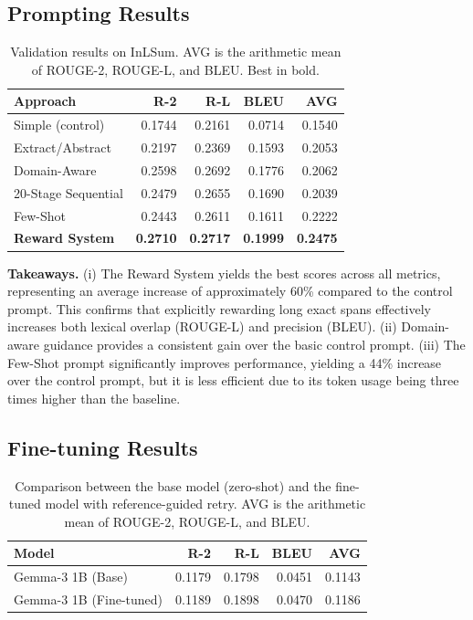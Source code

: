 \documentclass[sigconf]{acmart}
\begin{document}
\subsection{Prompting Results}
\begin{table}[h!]
\centering
\small
\begin{tabular}{lrrrr}
\toprule
\textbf{Approach} & \textbf{R-2} & \textbf{R-L} & \textbf{BLEU} & \textbf{AVG}\\
\midrule
Simple (control) & 0.1744 & 0.2161 & 0.0714 & 0.1540\\
Extract/Abstract & 0.2197 & 0.2369 & 0.1593 & 0.2053\\
Domain-Aware & 0.2598 & 0.2692 & 0.1776 & 0.2062\\
20-Stage Sequential & 0.2479 & 0.2655 & 0.1690 & 0.2039\\
Few-Shot & 0.2443 & 0.2611 & 0.1611 & 0.2222\\
\textbf{Reward System} & \textbf{0.2710} & \textbf{0.2717} & \textbf{0.1999} & \textbf{0.2475}\\
\bottomrule
\end{tabular}
\caption{Validation results on InLSum. AVG is the arithmetic mean of ROUGE-2, ROUGE-L, and BLEU. Best in bold.}
\label{tab:results}
\end{table}

\noindent \textbf{Takeaways.} (i) The Reward System yields the best scores across all metrics, representing an average increase of approximately 60\% compared to the control prompt. This confirms that explicitly rewarding long exact spans effectively increases both lexical overlap (ROUGE-L) and precision (BLEU). (ii) Domain-aware guidance provides a consistent gain over the basic control prompt. (iii) The Few-Shot prompt significantly improves performance, yielding a 44\% increase over the control prompt, but it is less efficient due to its token usage being three times higher than the baseline.


\subsection{Fine-tuning Results}
\begin{table}[H]
\centering
\small
\begin{tabular}{lrrrr}
\toprule
\textbf{Model} & \textbf{R-2} & \textbf{R-L} & \textbf{BLEU} & \textbf{AVG}\\
\midrule
Gemma-3 1B (Base) & 0.1179 & 0.1798 & 0.0451 & 0.1143\\
Gemma-3 1B (Fine-tuned) & 0.1189 & 0.1898 & 0.0470 & 0.1186\\
\bottomrule
\end{tabular}
\caption{Comparison between the base model (zero-shot) and the fine-tuned model with reference-guided retry. AVG is the arithmetic mean of ROUGE-2, ROUGE-L, and BLEU.}
\label{tab:results_ft}
\end{table}
\end{document}
